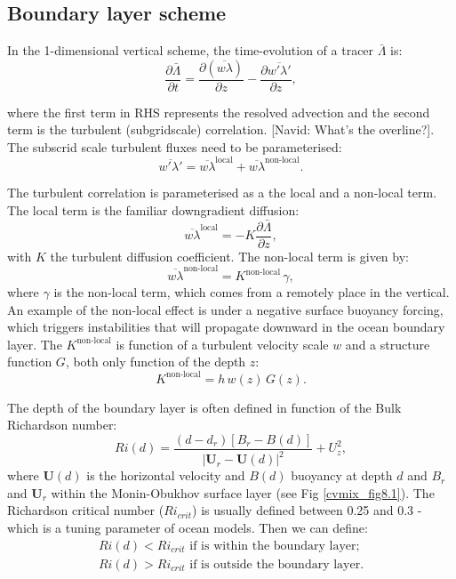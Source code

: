 \subsection{Boundary layer scheme}

In the 1-dimensional vertical scheme, the time-evolution of a tracer $\bar{\Lambda}$ is:
\begin{equation}
    \frac{\partial \bar{\Lambda}}{\partial t} = \frac{\partial(\overline{w \lambda})}{\partial z} - \frac{\partial \overline{w' \lambda '}}{\partial z},
\end{equation}

where the first term in RHS represents the resolved advection and the second term is the turbulent (subgridscale) correlation. {\color{red}[Navid: What's the overline?]}. {\color{red}The subscrid scale turbulent fluxes need} to be parameterised:
\begin{equation}
    \overline{w' \lambda '} = \overline{w \lambda}^{\text{local}} + \overline{w \lambda}^{\text{non-local}}.
\end{equation}

The turbulent correlation is parameterised as a the local and a  non-local term. The local term is the familiar downgradient diffusion:
\begin{equation}
     \overline{w \lambda}^{\text{local}} = -K \frac{\partial \bar{\Lambda}}{\partial z},
\end{equation}
with $K$ the turbulent diffusion coefficient. The non-local term is given by:
\begin{equation}
    \overline{w \lambda}^{\text{non-local}} = K^{\text{non-local}} \, \gamma,
\end{equation}
where $\gamma$ is the non-local term, which comes from a remotely place in the vertical. An example of the non-local effect is under a negative surface buoyancy forcing, which triggers instabilities that will propagate downward in the ocean boundary layer. The $K^{\text{non-local}}$ is function of a turbulent velocity scale $w$ and a structure function $G$, both only function of the depth $z$:
\begin{equation}
    K^{\text{non-local}} = h \, w(z) \, G(z).
\end{equation}

The depth of the boundary layer is often defined in function of the Bulk Richardson number:
\begin{equation}
    Ri(d) = \frac{(d-d_{r}) \left[ B_{r} - B(d) \right]}{| \boldsymbol{U}_{r} - \boldsymbol{U}(d) |^{2}} + U^{2}_{z},
\end{equation}
where $\boldsymbol{U}(d)$ is the horizontal velocity and $B(d)$ buoyancy at depth $d$ and $B_{r}$ and $\boldsymbol{U}_{r}$ within the Monin-Obukhov surface layer (see Fig \ref{cvmix_fig8.1}). The Richardson critical number ($Ri_{crit}$) is usually defined between 0.25 and 0.3 - which is a tuning parameter of ocean models. Then we can define:
\begin{align*}
    Ri(d) < Ri_{crit} \textrm{ if is within the boundary layer;}\\
    Ri(d) > Ri_{crit} \textrm{ if is outside the boundary layer.}
\end{align*}
